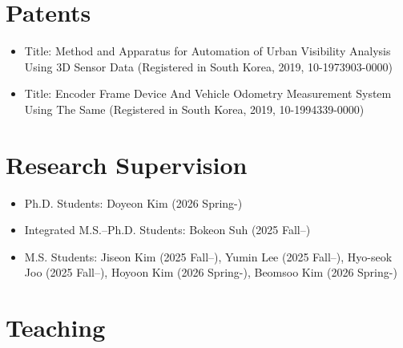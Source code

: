 \documentclass{cv} %
\begin{document}
\section{Patents}
\begin{itemize}[label=$\cdot$]
\item Title: Method and Apparatus for Automation of Urban Visibility Analysis Using 3D Sensor Data (Registered in South Korea, 2019, 10-1973903-0000)
\vspace{-1mm}
\item Title: Encoder Frame Device And Vehicle Odometry Measurement System Using The Same (Registered in South Korea, 2019, 10-1994339-0000)
\end{itemize} 

\section{Research Supervision}
\begin{itemize}[label=$\cdot$]
  \item Ph.D. Students: Doyeon Kim (2026 Spring-)
  \item Integrated M.S.–Ph.D. Students: Bokeon Suh (2025 Fall–)
  \item M.S. Students: Jiseon Kim (2025 Fall–), Yumin Lee (2025 Fall–), Hyo-seok Joo (2025 Fall–), Hoyoon Kim (2026 Spring-), Beomsoo Kim (2026 Spring-)
\end{itemize}

\section{Teaching}
\end{document}
